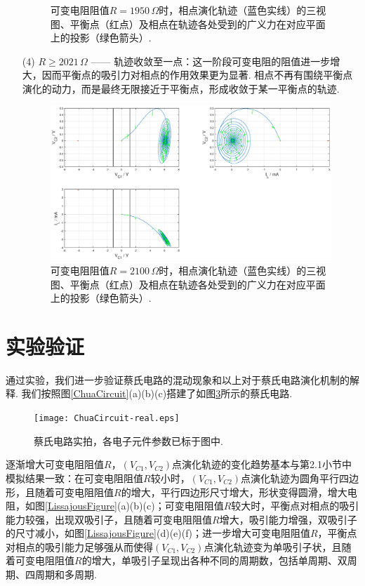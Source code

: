 \documentclass[a4paper, 10pt]{article}
\begin{document}
\begin{multicols*}{2}
\begin{itemize}
\begin{figure}[H]
        \caption{可变电阻阻值$R=1950\,\Omega$时，相点演化轨迹（蓝色实线）的三视图、平衡点（红点）及相点在轨迹各处受到的广义力在对应平面上的投影（绿色箭头）.}
        \label{Generalized-force-R=1950}
    \end{figure}
    \item[(4)] $R\geq 2021\,\Omega$ —— 轨迹收敛至一点：这一阶段可变电阻的阻值进一步增大，因而平衡点的吸引力对相点的作用效果更为显著. 相点不再有围绕平衡点演化的动力，而是最终无限接近于平衡点，形成收敛于某一平衡点的轨迹.
    \begin{figure}[H]
        \centering
        \includegraphics[width=\columnwidth]{Generalized-force-R=2100.eps}
        \caption{可变电阻阻值$R=2100\,\Omega$时，相点演化轨迹（蓝色实线）的三视图、平衡点（红点）及相点在轨迹各处受到的广义力在对应平面上的投影（绿色箭头）.}
        \label{Generalized-force-R=2100}
    \end{figure}
\end{itemize}

\section{实验验证}
通过实验，我们进一步验证蔡氏电路的混动现象和以上对于蔡氏电路演化机制的解释. 我们按照图\ref{ChuaCircuit}(a)(b)(c)搭建了如图\ref{ChuaCircuit-real}所示的蔡氏电路.

\begin{figure}[H]
    \centering
    \texttt{[image: ChuaCircuit-real.eps]}
    \caption{蔡氏电路实拍，各电子元件参数已标于图中.}
    \label{ChuaCircuit-real}
\end{figure}

逐渐增大可变电阻阻值$R$，$(V_{C1},V_{C2})$点演化轨迹的变化趋势基本与第2.1小节中模拟结果一致：在可变电阻阻值$R$较小时，$(V_{C1},V_{C2})$点演化轨迹为圆角平行四边形，且随着可变电阻阻值$R$的增大，平行四边形尺寸增大，形状变得圆滑，增大电阻，如图\ref{LissajousFigure}(a)(b)(c)；可变电阻阻值$R$较大时，平衡点对相点的吸引能力较强，出现双吸引子，且随着可变电阻阻值$R$增大，吸引能力增强，双吸引子的尺寸减小，如图\ref{LissajousFigure}(d)(e)(f)；进一步增大可变电阻阻值$R$，平衡点对相点的吸引能力足够强从而使得$(V_{C1},V_{C2})$点演化轨迹变为单吸引子状，且随着可变电阻阻值$R$的增大，单吸引子呈现出各种不同的周期数，包括单周期、双周期、四周期和多周期.


\end{multicols*}
\end{document}
